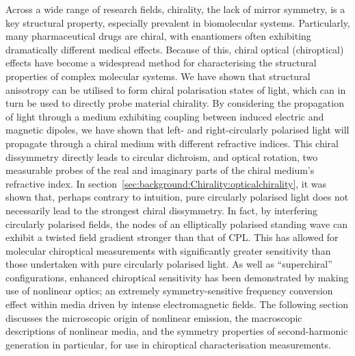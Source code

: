 Across a wide range of research fields, chirality, the lack of mirror symmetry, is a key structural property, especially prevalent in biomolecular systems. Particularly, many pharmaceutical drugs are chiral, with enantiomers often exhibiting dramatically different medical effects.
Because of this, chiral optical (chiroptical) effects have become a widespread method for characterising the structural properties of complex molecular systems.
We have shown that structural anisotropy can be utilised to form chiral polarisation states of light, which can in turn be used to directly probe material chirality.
By considering the propagation of light through a medium exhibiting coupling between induced electric and magnetic dipoles, we have shown that left- and right-circularly polarised light will propagate through a chiral medium with different refractive indices. This chiral dissymmetry directly leads to circular dichroism, and optical rotation, two measurable probes of the real and imaginary parts of the chiral medium's refractive index.
In section~\ref{sec:background:Chirality:opticalchirality}, it was shown that, perhaps contrary to intuition, pure circularly polarised light does not necessarily lead to the strongest chiral dissymmetry. In fact, by interfering circularly polarised fields, the nodes of an elliptically polarised standing wave can exhibit a twisted field gradient stronger than that of CPL. This has allowed for molecular chiroptical measurements with significantly greater sensitivity than those undertaken with pure circularly polarised light.
As well as ``superchiral'' configurations, enhanced chiroptical sensitivity has been demonstrated by making use of nonlinear optics; an extremely symmetry-sensitive frequency conversion effect within media driven by intense electromagnetic fields. The following section discusses the microscopic origin of nonlinear emission, the macroscopic descriptions of nonlinear media, and the symmetry properties of second-harmonic generation in particular, for use in chiroptical characterisation measurements.